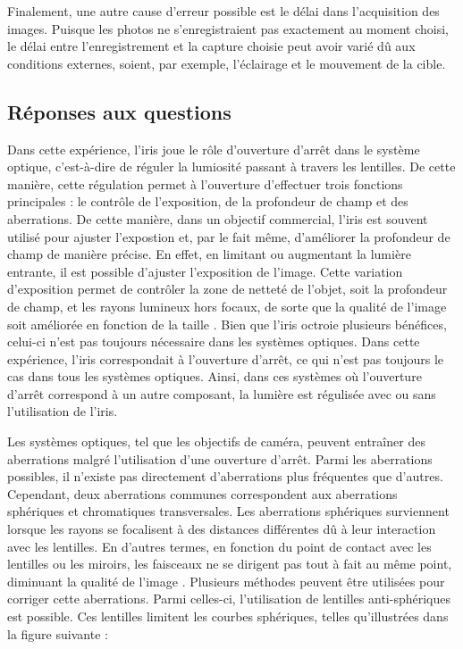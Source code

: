 \documentclass[11pt,letterpaper]{article}
\begin{document}
Finalement, une autre cause d'erreur possible est le délai dans l'acquisition des images. Puisque les photos ne s'enregistraient pas exactement au moment choisi, le délai entre l'enregistrement et la capture choisie peut avoir varié dû aux conditions externes, soient, par exemple, l'éclairage et le mouvement de la cible.

\subsection{Réponses aux questions}
Dans cette expérience, l'iris joue le rôle d'ouverture d'arrêt dans le système optique, c'est-à-dire de réguler la lumiosité passant à travers les lentilles. De cette manière, cette régulation permet à l'ouverture d'effectuer trois fonctions principales : le contrôle de l'exposition, de la profondeur de champ et des aberrations. De cette manière, dans un objectif commercial, l'iris est souvent utilisé pour ajuster l'expostion et, par le fait même, d'améliorer la profondeur de champ de manière précise. En effet, en limitant ou augmentant la lumière entrante, il est possible d'ajuster l'exposition de l'image. Cette variation d'exposition permet de contrôler la zone de netteté de l'objet, soit la profondeur de champ, et les rayons lumineux hors focaux, de sorte que la qualité de l'image soit améliorée en fonction de la taille \cite{meyer_aperture_2023}. Bien que l'iris octroie plusieurs bénéfices, celui-ci n'est pas toujours nécessaire dans les systèmes optiques. Dans cette expérience, l'iris correspondait à l'ouverture d'arrêt, ce qui n'est pas toujours le cas dans tous les systèmes optiques. Ainsi, dans ces systèmes où l'ouverture d'arrêt correspond à un autre composant, la lumière est régulisée avec ou sans l'utilisation de l'iris.

Les systèmes optiques, tel que les objectifs de caméra, peuvent entraîner des aberrations malgré l'utilisation d'une ouverture d'arrêt. Parmi les aberrations possibles, il n'existe pas directement d'aberrations plus fréquentes que d'autres. Cependant, deux aberrations communes correspondent aux aberrations sphériques et chromatiques transversales. Les aberrations sphériques surviennent lorsque les rayons se focalisent à des distances différentes dû à leur interaction avec les lentilles. En d'autres termes, en fonction du point de contact avec les lentilles ou les miroirs, les faisceaux ne se dirigent pas tout à fait au même point, diminuant la qualité de l'image \cite{hollows_aberrations_2023}. Plusieurs méthodes peuvent être utilisées pour corriger cette aberrations. Parmi celles-ci, l'utilisation de lentilles anti-sphériques est possible. Ces lentilles limitent les courbes sphériques, telles qu'illustrées dans la figure suivante :
\end{document}
